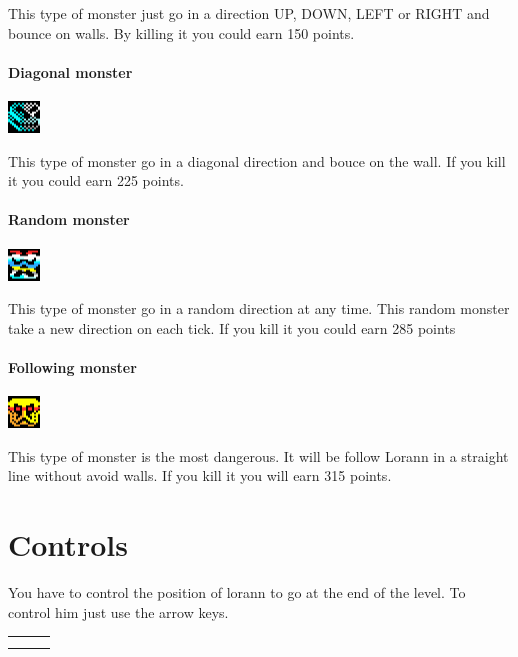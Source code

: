 \documentclass{report}
\begin{document}
This type of monster just go in a direction UP, DOWN, LEFT or RIGHT and bounce on walls. By killing it you could earn 150 points.

\paragraph{Diagonal monster}
\hspace{\fill}\includegraphics{resources/sprites/monster_2.png}

This type of monster go in a diagonal direction and bouce on the wall. If you kill it you could earn 225 points.

\paragraph{Random monster}
\hspace{\fill}\includegraphics{resources/sprites/monster_3.png}

This type of monster go in a random direction at any time. This random monster take a new direction on each tick. If you kill it you could earn 285 points

\paragraph{Following monster}
\hspace{\fill}\includegraphics{resources/sprites/monster_4.png}

This type of monster is the most dangerous. It will be follow Lorann in a straight line without avoid walls. If you kill it you will earn 315 points.

\section{Controls}

You have to control the position of lorann to go at the end of the level. To control him just use the arrow keys.

\begin{center}
\begin{tabular}{ccc}
& \keys{\arrowkeyup} & \\[4mm]
\keys{\arrowkeyleft} & \keys{\arrowkeydown} & \keys{\arrowkeyright} \\
\end{tabular}
\end{center}
\end{document}
